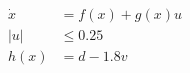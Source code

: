 \documentclass[preview]{standalone}
\begin{document}
\begin{align*}
\dot x &= f(x) + g(x) u\\ |u| &\leq 0.25\\ h(x) &= d - 1.8 v
\end{align*}
\end{document}
